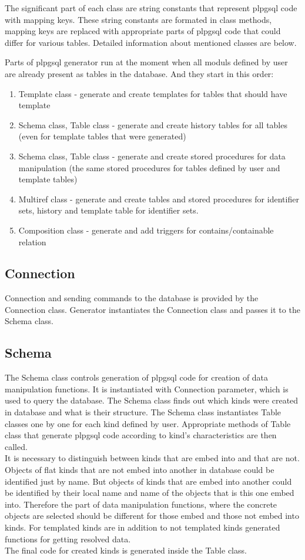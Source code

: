 \documentclass[deska]{subfiles}
\begin{document}
The significant part of each class are string constants that represent plpgsql code with mapping keys. These string constants are formated in class methods, mapping keys are replaced with appropriate parts of plpgsql code that could differ for various tables.
Detailed information about mentioned classes are below.

Parts of plpgsql generator run at the moment when all moduls defined by user are already present as tables in the database. And they start in this order:

\begin{enumerate}
    \item Template class - generate and create templates for tables that should have template
    \item Schema class, Table class - generate and create history tables for all tables (even for template tables that were generated)
    \item Schema class, Table class - generate and create stored procedures for data manipulation (the same stored procedures for tables defined by user and template tables)
    \item Multiref class - generate and create tables and stored procedures for identifier sets, history and template table for identifier sets.
    \item Composition class - generate and add triggers for contains/containable relation
\end{enumerate}

\subsection{Connection}
Connection and sending commands to the database is provided by the Connection class. Generator instantiates the Connection class and passes it to the Schema class.

\subsection{Schema}
The Schema class controls generation of plpgsql code for creation of data manipulation functions. It is instantiated with Connection parameter, which is used to query the database. 
The Schema class finds out which kinds were created in database and what is their structure. The Schema class instantiates Table classes one by one for each kind defined by user. Appropriate methods of Table class that generate plpgsql code according to kind's characteristics are then called.\\ It is necessary to distinguish between kinds that are embed into and that are not. Objects of flat kinds that are not embed into another in database could be identified just by name. But objects of kinds that are embed into another could be identified by their local name and name of the objects that is this one embed into. Therefore the part of data manipulation functions, where the concrete objects are selected should be different for those embed and those not embed into kinds.
For templated kinds are in addition to not templated kinds generated functions for getting resolved data.\\
The final code for created kinds is generated inside the Table class.
\end{document}
